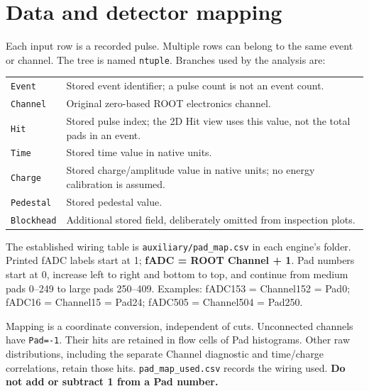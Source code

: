 \documentclass[11pt,a4paper]{article}
\begin{document}
\section{Data and detector mapping}
Each input row is a recorded pulse. Multiple rows can belong to the same event or
channel. The tree is named \texttt{ntuple}. Branches used by the analysis are:
\begin{longtable}{p{.20\linewidth}p{.73\linewidth}}
\texttt{Event} & Stored event identifier; a pulse count is not an event count.\\
\texttt{Channel} & Original zero-based ROOT electronics channel.\\
\texttt{Hit} & Stored pulse index; the 2D Hit view uses this value, not the total pads in an event.\\
\texttt{Time} & Stored time value in native units.\\
\texttt{Charge} & Stored charge/amplitude value in native units; no energy calibration is assumed.\\
\texttt{Pedestal} & Stored pedestal value.\\
\texttt{Blockhead} & Additional stored field, deliberately omitted from inspection plots.\\
\end{longtable}
The established wiring table is \texttt{auxiliary/pad\_map.csv} in each engine's
folder. Printed fADC labels start at 1; \textbf{fADC = ROOT Channel + 1}.
Pad numbers start at 0, increase left to right and bottom to top, and continue from
medium pads 0--249 to large pads 250--409. Examples: fADC153 = Channel152 = Pad0;
fADC16 = Channel15 = Pad24; fADC505 = Channel504 = Pad250.

Mapping is a coordinate conversion, independent of cuts. Unconnected channels have
\texttt{Pad=-1}. Their hits are retained in flow cells of Pad histograms. Other
raw distributions, including the separate Channel diagnostic and time/charge
correlations, retain those hits. \texttt{pad\_map\_used.csv} records the wiring used.
\textbf{Do not add or subtract 1 from a Pad number.}
\end{document}
